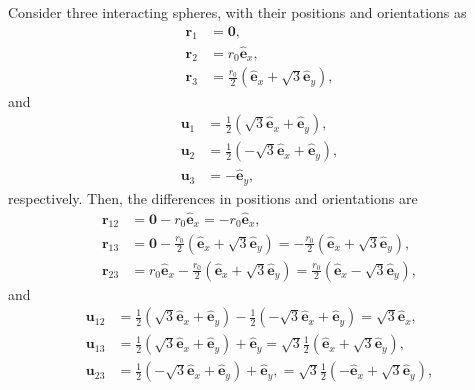 \documentclass[twocolumn,amsmath,amssymb,aps]{revtex4-1}%
\begin{document}
Consider three interacting spheres, with their positions and orientations as
\begin{subequations}
  \label{eqs:3hardspherepositions}
  \begin{align}
    \bm{r}_1 &= \bm{0},\\
    \bm{r}_2 &= r_0\bm{\hat{e}}_x,\\
    \bm{r}_3 &= \frac{r_0}{2}(\bm{\hat{e}}_x+\sqrt{3}\bm{\hat{e}}_y),
  \end{align}
\end{subequations}
and
\begin{subequations}
  \label{eqs:3hardsphereorientations}
  \begin{align}
    \bm{u}_1 &= \frac{1}{2}(\sqrt{3}\bm{\hat{e}}_x+\bm{\hat{e}}_y),\\
    \bm{u}_2 &= \frac{1}{2}(-\sqrt{3}\bm{\hat{e}}_x+\bm{\hat{e}}_y),\\
    \bm{u}_3 &= -\bm{\hat{e}}_y,
  \end{align}
\end{subequations}
respectively. Then, the differences in positions and orientations are
\begin{subequations}
  \label{eqs:3hardsphererelativepositions}
  \begin{align}
    \bm{r}_{12} &= \bm{0}-r_0\bm{\hat{e}}_x = -r_0\bm{\hat{e}}_x,\\
    \bm{r}_{13} &= \bm{0}-\frac{r_0}{2}(\bm{\hat{e}}_x+\sqrt{3}\bm{\hat{e}}_y)
    = -\frac{r_0}{2}(\bm{\hat{e}}_x+\sqrt{3}\bm{\hat{e}}_y),\\
    \bm{r}_{23} &= r_0\bm{\hat{e}}_x-\frac{r_0}{2}(\bm{\hat{e}}_x
    +\sqrt{3}\bm{\hat{e}}_y)
    =\frac{r_0}{2}(\bm{\hat{e}}_x-\sqrt{3}\bm{\hat{e}}_y),
  \end{align}
\end{subequations}
and
\begin{subequations}
  \label{eqs:3hardsphererelativeorientations}
  \begin{align}
    \bm{u}_{12} &= \frac{1}{2}(\sqrt{3}\bm{\hat{e}}_x+\bm{\hat{e}}_y)
    -\frac{1}{2}(-\sqrt{3}\bm{\hat{e}}_x+\bm{\hat{e}}_y)
    = \sqrt{3}\bm{\hat{e}}_x,\\
    \bm{u}_{13} &= \frac{1}{2}(\sqrt{3}\bm{\hat{e}}_x+\bm{\hat{e}}_y)
    +\bm{\hat{e}}_y
    = \sqrt{3}\frac{1}{2}(\bm{\hat{e}}_x+\sqrt{3}\bm{\hat{e}}_y),\\
    \bm{u}_{23} &= \frac{1}{2}(-\sqrt{3}\bm{\hat{e}}_x+\bm{\hat{e}}_y)
    +\bm{\hat{e}}_y,
    = \sqrt{3}\frac{1}{2}(-\bm{\hat{e}}_x+\sqrt{3}\bm{\hat{e}}_y),
  \end{align}
\end{subequations}
\end{document}
